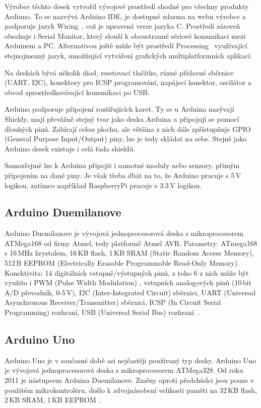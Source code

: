 Výrobce těchto desek vytvořil vývojové prostředí shodné pro všechny produkty Ardiuno. To se nazvývá Arduino IDE, je dostupné zdarma na webu výrobce a podporuje jazyk Wiring~\cite{embed_about_wiring_2011}, což je upravená verze jazyka C. Prostředí zároveň obsahuje i Serial Monitor, který slouží k oboustranné sériové komunikaci mezi Arduinem a PC. Alternativou ještě může být prostředí Processing~\cite{embed_about_processing_2015} využívající stejnojmenný jazyk, umožňující vytváření grafických multiplatformních aplikací.
	
Na deskách bývá několik diod, resetovací tlačítko, různé přídavné sběrnice (UART, I2C), konektory pro ICSP programování, napájecí konektor, oscilátor a obvod zprostředkovávající komunikaci po USB.
	
Arduino podporuje připojení rozšiřujících karet. Ty se u Arduina nazývají Shieldy, mají převážně stejný tvar jako deska Arduina a připojují se pomocí dlouhých pinů. Zabírají celou plochu, ale většina z nich dále zpřístupňuje GPIO (General Purpose Input/Output) piny, lze je tedy skládat na sebe. Stejně jako Arduino desek existuje i celá řada shieldů.
	
Samozřejmě lze k Arduinu připojit i samotné moduly nebo senzory, přímým připojením na dané piny. Je však třeba dbát na to, že Arduino pracuje s 5\,V logikou, zatímco například RaspberryPi pracuje s 3.3\,V logikou.
	
		\subsection{Arduino Duemilanove} Arduino Duemilanove je vývojová jednoprocesorová deska s mikroprocesorem ATMega168 od firmy Atmel, tedy platformě Atmel AVR. 
		Parametry: ATmega168 s 16\,MHz krystalem, 16\,KB flash, 1\,KB SRAM (Static Random Access Memory), 512\,B EEPROM (Electrically Erasable Programmable Read-Only Memory). 	Konektivita: 14 digitálních vstupně/výstupných pinů, z toho 6 z nich může být využito i PWM (Pulse Width Modulation) , vstupních analogových pinů (10\,bit A/D převodník, 0-5\,V), I2C (Inter-Integrated Circuit) sběrnici, UART (Universal Asynchronous Receiver/Transmitter) sběrnici, ICSP (In Circuit Serial Programming) rozhraní, USB (Universal Serial Bus) rozhraní~\cite{ArduinoDuemilanove}.	
	
		\subsection{Arduino Uno} Arduino Uno je v současné době asi nejčastěji používaný typ desky. Arduino Uno je vývojová jednoprocesorová deska s mikroprocesorem ATMega328. Od roku 2011 je nástupcem Arduina Duemilanove. Změny oproti předchůdci jsou pouze v použitém mikrokontroléru, došlo k zdvojnásobení velikosti paměti na 32\,KB flash, 2\,KB SRAM, 1\,KB EEPROM~\cite{ArduinoUno}.
	

